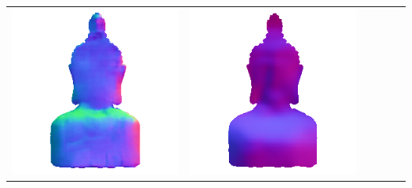 \begin{center}
\begin{tabularx}{\linewidth}{@{}Y@{}Y@{}Y@{}Y@{}Y@{}Y@{}}
\includegraphics[width=\linewidth]{semisynthetic/20150514_16_marrnet_out.png} &
\includegraphics[width=\linewidth]{semisynthetic/20150514_16_ef_out.png} \\

\end{tabularx}
\end{center}
